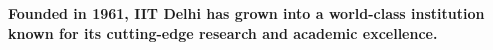 
\textbf{Founded in 1961, IIT Delhi has grown into a world-class institution known for its cutting-edge research and academic excellence.}
